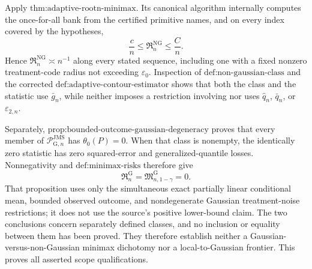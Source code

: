 Apply \(\text{thm:adaptive-rootn-minimax}\).  Its canonical algorithm internally computes the once-for-all bank from the certified primitive names, and on every index covered by the hypotheses,
\[
 \frac cn\le\mathfrak R_n^{\mathrm{NG}}\le\frac Cn.
\]
Hence \(\mathfrak R_n^{\mathrm{NG}}\asymp n^{-1}\) along every stated sequence, including one with a fixed nonzero treatment-code radius not exceeding \(\varepsilon_0\).  Inspection of \(\text{def:non-gaussian-class}\) and the corrected \(\text{def:adaptive-contour-estimator}\) shows that both the class and the statistic use \(\bar g_n\), while neither imposes a restriction involving nor uses \(\widehat q_n\), \(\bar q_n\), or \(\varepsilon_{2,n}\).

Separately, \(\text{prop:bounded-outcome-gaussian-degeneracy}\) proves that every member of \(\mathcal P_{\mathrm G,n}^{\mathrm{JMS}}\) has \(\theta_0(P)=0\).  When that class is nonempty, the identically zero statistic has zero squared-error and generalized-quantile losses.  Nonnegativity and \(\text{def:minimax-risks}\) therefore give
\[
 \mathfrak R_n^{\mathrm G}
 =\mathfrak M_{n,1-\gamma}^{\mathrm G}=0.
\]
That proposition uses only the simultaneous exact partially linear conditional mean, bounded observed outcome, and nondegenerate Gaussian treatment-noise restrictions; it does not use the source's positive lower-bound claim.  The two conclusions concern separately defined classes, and no inclusion or equality between them has been proved.  They therefore establish neither a Gaussian-versus-non-Gaussian minimax dichotomy nor a local-to-Gaussian frontier.  This proves all asserted scope qualifications.
